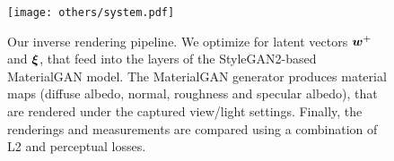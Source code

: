 \begin{figure}[t]
	\centering
	\texttt{[image: others/system.pdf]}
	\caption{Our inverse rendering pipeline. We optimize for latent vectors $\bm{w}^+$ and $\bm{\xi}$, that feed into the layers of the StyleGAN2-based MaterialGAN model. The MaterialGAN generator produces material maps (diffuse albedo, normal, roughness and specular albedo), that are rendered under the captured view/light settings. Finally, the renderings and measurements are compared using a combination of L2 and perceptual losses.}
	\label{fig:system}
\end{figure}
